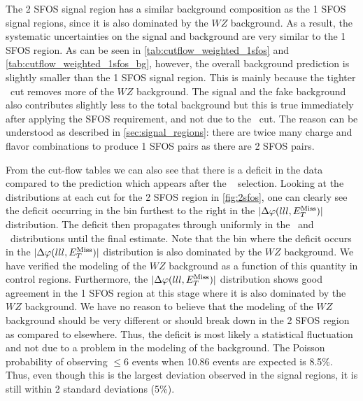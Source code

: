 The 2 SFOS signal region has a similar background composition as
the 1 SFOS signal regions, since it is also dominated by 
the $WZ$ background.  As a result, the systematic uncertainties
on the signal and background are very similar to the 1 SFOS region.
As can be seen
in
\tab\ref{tab:cutflow_weighted_1sfos}
and 
\tab\ref{tab:cutflow_weighted_1sfos_bg},
however,
the overall background prediction
is slightly smaller than the 1 SFOS signal region.
This is 
mainly because the tighter \MET~cut removes more of the $WZ$ background.
The signal and the 
fake background also contributes slightly less to the total
background but this is true
immediately after applying the SFOS requirement, and not
due to the \MET~cut.
The reason can be understood 
as described in \sec\ref{sec:signal_regions}:
there are twice many charge and flavor combinations to produce
1 SFOS pairs as there are 2 SFOS pairs.


From the cut-flow tables we can also see that there is a deficit in the data
compared to the prediction which appears after the \deltaphi~
selection. Looking at the distributions at each cut for 
the 2 SFOS region in \fig\ref{fig:2sfos},
one can clearly see the deficit occurring in the bin
furthest to the right in the $|\Delta\varphi(lll,E_{T}^{\textrm{Miss}})|$ distribution.
The deficit then propagates through uniformly in the 
\njet~and \nmu~distributions until the final estimate.
Note that the bin where the deficit occurs in the $|\Delta\varphi(lll,E_{T}^{\textrm{Miss}})|$
distribution is also dominated by the $WZ$ background.
We have verified the modeling of the $WZ$ background
as a function of this quantity in control regions. 
Furthermore, the $|\Delta\varphi(lll,E_{T}^{\textrm{Miss}})|$ distribution
shows good agreement in the 1 SFOS region at this stage
where it is also dominated by the $WZ$ background.
We have no reason to believe that the modeling of the $WZ$
background should be very different or should 
break down in the 2 SFOS region as compared to elsewhere.
Thus, the deficit is most likely a statistical fluctuation
and not due to a problem in the modeling of the 
background.
The Poisson probability of observing $\leq 6$ events
when 10.86 events are expected is 8.5\%.
Thus, even though this is the largest deviation observed in the signal
regions, it is still within 2 standard deviations (5\%).


